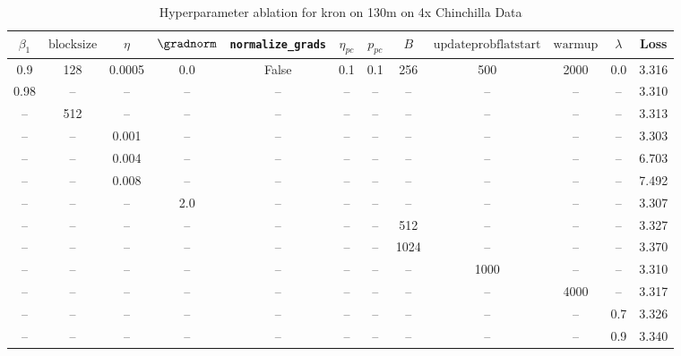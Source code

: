 \begin{table}[h!]
\centering
\caption{Hyperparameter ablation for kron on 130m on 4x Chinchilla Data}
\label{tab:ablation_kron_130m_on_4x_chinchilla_data}
\begin{tabular}{cccccccccccc}
\toprule
$\beta_1$ & $\mathrm{block size}$ & $\eta$ & $\gradnorm$ & \texttt{normalize\_grads} & $\eta_{pc}$ & $p_{pc}$ & $B$ & $\mathrm{update prob flat start}$ & $\mathrm{warmup}$ & $\lambda$ & Loss \\
\midrule
0.9 & 128 & 0.0005 & 0.0 & False & 0.1 & 0.1 & 256 & 500 & 2000 & 0.0 & 3.316 \\
\midrule
0.98 & -- & -- & -- & -- & -- & -- & -- & -- & -- & -- & 3.310 \\
-- & 512 & -- & -- & -- & -- & -- & -- & -- & -- & -- & 3.313 \\
-- & -- & 0.001 & -- & -- & -- & -- & -- & -- & -- & -- & 3.303 \\
-- & -- & 0.004 & -- & -- & -- & -- & -- & -- & -- & -- & 6.703 \\
-- & -- & 0.008 & -- & -- & -- & -- & -- & -- & -- & -- & 7.492 \\
-- & -- & -- & 2.0 & -- & -- & -- & -- & -- & -- & -- & 3.307 \\
-- & -- & -- & -- & -- & -- & -- & 512 & -- & -- & -- & 3.327 \\
-- & -- & -- & -- & -- & -- & -- & 1024 & -- & -- & -- & 3.370 \\
-- & -- & -- & -- & -- & -- & -- & -- & 1000 & -- & -- & 3.310 \\
-- & -- & -- & -- & -- & -- & -- & -- & -- & 4000 & -- & 3.317 \\
-- & -- & -- & -- & -- & -- & -- & -- & -- & -- & 0.7 & 3.326 \\
-- & -- & -- & -- & -- & -- & -- & -- & -- & -- & 0.9 & 3.340 \\
\bottomrule
\end{tabular}
\end{table}

